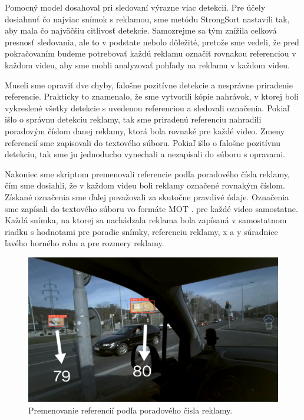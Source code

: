 Pomocný model dosahoval pri sledovaní výrazne viac detekcií. Pre účely dosiahnuť čo najviac snímok s reklamou, sme metódu StrongSort nastavili tak, aby mala čo najväčšiu citlivosť detekcie. Samozrejme sa tým znížila celková presnosť sledovania, ale to v podstate nebolo dôležité, pretože sme vedeli, že pred pokračovaním budeme potrebovať každú reklamu označiť rovnakou referenciou v každom videu, aby sme mohli analyzovať pohľady na reklamu v každom videu.

Museli sme opraviť dve chyby, falošne pozitívne detekcie a nesprávne priradenie referencie. Prakticky to znamenalo, že sme vytvorili kópie nahrávok, v ktorej boli vykreslené všetky detekcie s uvedenou referenciou a sledovali označenia. Pokiaľ išlo o správnu detekciu reklamy, tak sme priradenú referenciu nahradili poradovým číslom danej reklamy, ktorá bola rovnaké pre každé video. Zmeny referencií sme zapisovali do textového súboru. Pokiaľ išlo o falošne pozitívnu detekciu, tak sme ju jednoducho vynechali a nezapísali do súboru s opravami.

Nakoniec sme skriptom premenovali referencie podľa poradového čísla reklamy, čím sme dosiahli, že v každom videu boli reklamy označené rovnakým číslom. Získané označenia sme ďalej považovali za skutočne pravdivé údaje. Označenia sme zapísali do textového súboru vo formáte MOT \cite{mot}. pre každé video samostatne. Každá snímka, na ktorej sa nachádzala reklama bola zapísaná v samostatnom riadku s hodnotami pre poradie snímky, referenciu reklamy, x a y súradnice ľavého horného rohu a pre rozmery reklamy.

\begin{figure}[ht]
     \centering
     \includegraphics[width=1\textwidth]{images/04/mapping.jpg}
     \caption{Premenovanie referencií podľa poradového čísla reklamy.}
     \label{img:mapping}
 \end{figure}

